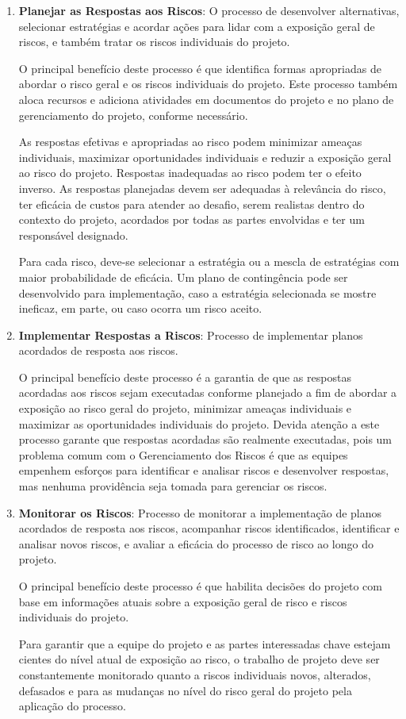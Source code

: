\documentclass[
	12pt,
	openright,
	twoside,
	a4paper,
	english,
	brazil
	]{abntex2}
\begin{document}
\begin{enumerate}
  \item \textbf{Planejar as Respostas aos Riscos}: O processo de desenvolver alternativas, selecionar estratégias e acordar ações para lidar com a exposição geral de riscos, e também tratar os riscos individuais do projeto.
  
  O principal benefício deste processo é que identifica formas apropriadas de abordar o risco geral e os riscos individuais do projeto. Este processo também aloca recursos e adiciona atividades em documentos do projeto e no plano de gerenciamento do projeto, conforme necessário.
  
  As respostas efetivas e apropriadas ao risco podem minimizar ameaças individuais, maximizar oportunidades individuais e reduzir a exposição geral ao risco do projeto. Respostas inadequadas ao risco podem ter o efeito inverso. As respostas planejadas devem ser adequadas à relevância do risco, ter eficácia de custos para atender ao desafio, serem realistas dentro do contexto do projeto, acordados por todas as partes envolvidas e ter um responsável designado.  
  
  Para cada risco, deve-se selecionar a estratégia ou a mescla de estratégias com maior probabilidade de eficácia. Um plano de contingência pode ser desenvolvido para implementação, caso a estratégia selecionada se mostre ineficaz, em parte, ou caso ocorra um risco aceito.

  \item \textbf{Implementar Respostas a Riscos}: Processo de implementar planos acordados de resposta aos riscos.
  
  O principal benefício deste processo é a garantia de que as respostas acordadas aos riscos sejam executadas conforme planejado a fim de abordar a exposição ao risco geral do projeto, minimizar ameaças individuais e maximizar as oportunidades individuais do projeto. Devida atenção a este processo garante que respostas acordadas são realmente executadas, pois um problema comum com o Gerenciamento dos Riscos é que as equipes empenhem esforços para identificar e analisar riscos e desenvolver respostas, mas nenhuma providência seja tomada para gerenciar os riscos.

  \item \textbf{Monitorar os Riscos}: Processo de monitorar a implementação de planos acordados de resposta aos riscos, acompanhar riscos identificados, identificar e analisar novos riscos, e avaliar a eficácia do processo de risco ao longo do projeto.
  
  O principal benefício deste processo é que habilita decisões do projeto com base em informações atuais sobre a exposição geral de risco e riscos individuais do projeto.
  
  Para garantir que a equipe do projeto e as partes interessadas chave estejam cientes do nível atual de exposição ao risco, o trabalho de projeto deve ser constantemente monitorado quanto a riscos individuais novos, alterados, defasados e para as mudanças no nível do risco geral do projeto pela aplicação do processo.
\end{enumerate}
\end{document}
